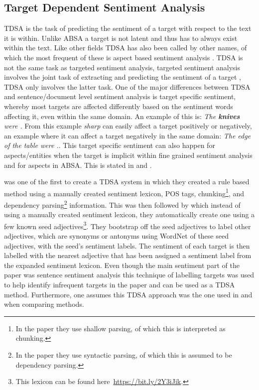 \subsection{Target Dependent Sentiment Analysis}

TDSA is the task of predicting the sentiment of a target with respect to the text it is within. Unlike ABSA a target is not latent and thus has to always exist within the text. Like other fields TDSA has also been called by other names, of which the most frequent of these is aspect based sentiment analysis \citep{wang-etal-2016-attention}. TDSA is not the same task as targeted sentiment analysis, targeted sentiment analysis involves the joint task of extracting and predicting the sentiment of a target \citep{mitchell-etal-2013-open}, TDSA only involves the latter task. One of the major differences between TDSA and sentence/document level sentiment analysis is target specific sentiment, whereby most targets are affected differently based on the sentiment words affecting it, even within the same domain. An example of this is: \textit{The \textbf{knives} were .} From this example \textit{sharp} can easily affect a target positively or negatively, an example where it can affect a target negatively in the same domain: \textit{The edge of the table were .}. This target specific sentiment can also happen for aspects/entities when the target is implicit within fine grained sentiment analysis and for aspects in ABSA. This is stated in \citet[\S2]{ding2008holistic} and \citet[\S3.3.4]{popescu-etzioni-2005-extracting}.

\citet{nasukawa2003sentiment} was one of the first to create a TDSA system in which they created a rule based method using a manually created sentiment lexicon, POS tags, chunking\footnote{In the paper they use shallow parsing, of which this is interpreted as chunking.}, and dependency parsing\footnote{In the paper they use syntactic parsing, of which this is assumed to be dependency parsing.} information. This was then followed by \citep{hu2004mining} which instead of using a manually created sentiment lexicon, they automatically create one using a few known seed adjectives\footnote{This lexicon can be found here~\url{https://bit.ly/2Y3iJik}.}.  They bootstrap off the seed adjectives to label other adjectives, which are synonyms or antonyms using WordNet \citep{miller1995wordnet} of these seed adjectives, with the seed's sentiment labels. The sentiment of each target is then labelled with the nearest adjective that has been assigned a sentiment label from the expanded sentiment lexicon. Even though the main sentiment part of the paper was sentence sentiment analysis this technique of labelling targets was used to help identify infrequent targets in the paper and can be used as a TDSA method. Furthermore, one assumes this TDSA approach was the one used in \citet{popescu-etzioni-2005-extracting} and \citet{ding2008holistic} when comparing methods.

